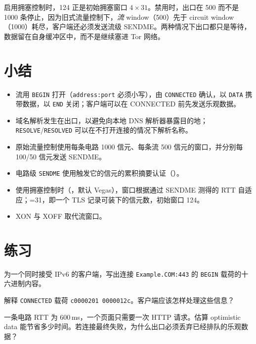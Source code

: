 启用拥塞控制时，124 正是初始拥塞窗口 $4\times31$。禁用时，出口在 500 而不是 1000 条停止，因为旧式流量控制下，\emph{流} window（500）先于 circuit window（1000）耗尽，客户端还必须发送流级 SENDME。两种情况下出口都只是等待，数据留在自身缓冲区中，而不是继续塞进 Tor 网络。

\section*{小结}
\begin{itemize}
  \item 流用 \texttt{BEGIN} 打开（\texttt{address:port} 必须小写），由 \texttt{CONNECTED} 确认，以 \texttt{DATA} 携带数据，以 \texttt{END} 关闭；客户端可以在 CONNECTED 前先发送乐观数据。
  \item 域名解析发生在出口，以避免向本地 DNS 解析器暴露目的地；\texttt{RESOLVE}/\texttt{RESOLVED} 可以在不打开连接的情况下解析名称。
  \item 原始流量控制使用每条电路 1000 信元、每条流 500 信元的窗口，并分别每 100/50 信元发送 SENDME。
  \item 电路级 \texttt{SENDME} 使用触发它的信元的累积摘要认证（）。
  \item 使用拥塞控制时（，默认 Vegas），窗口根据通过 SENDME 测得的 RTT 自适应；=31，即一个 TLS 记录可装下的信元数，初始窗口 124。
  \item XON 与 XOFF 取代流窗口。
\end{itemize}

\section*{练习}

\begin{esercizio}[1]\label{es:11-begin}
为一个同时接受 IPv6 的客户端，写出连接 \texttt{Example.COM:443} 的 \texttt{BEGIN} 载荷的十六进制内容。
\end{esercizio}

\begin{esercizio}[1]\label{es:11-connected}
解释 \texttt{CONNECTED} 载荷 \texttt{c0000201 0000012c}。客户端应该怎样处理这些信息？
\end{esercizio}

\begin{esercizio}[1]\label{es:11-optimistic}
一条电路 RTT 为 600\,ms，一个页面只需要一次 HTTP 请求。估算 optimistic data 能节省多少时间。若连接最终失败，为什么出口必须丢弃已经排队的乐观数据？
\end{esercizio}

